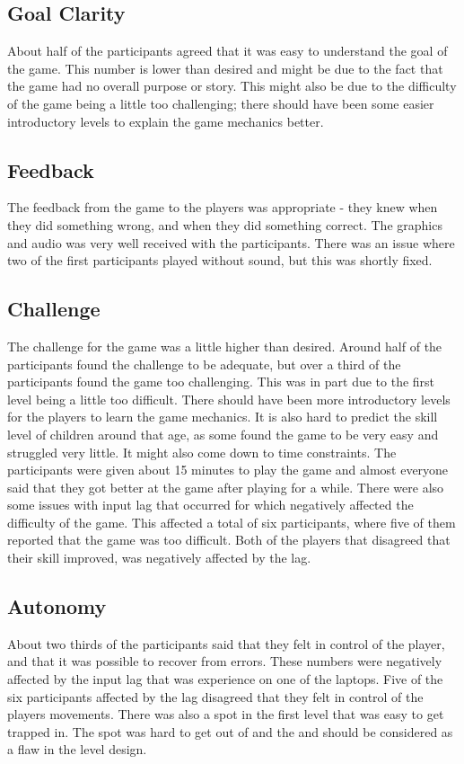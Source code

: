 \subsection{Goal Clarity}
About half of the participants agreed that it was easy to understand the goal of the game. This number is lower than desired and might be due to the fact that the game had no overall purpose or story. This might also be due to the difficulty of the game being a little too challenging; there should have been some easier introductory levels to explain the game mechanics better.

\subsection{Feedback}
The feedback from the game to the players was appropriate - they knew when they did something wrong, and when they did something correct. The graphics and audio was very well received with the participants. There was an issue where two of the first participants played without sound, but this was shortly fixed.

\subsection{Challenge}
The challenge for the game was a little higher than desired. Around half of the participants found the challenge to be adequate, but over a third of the participants found the game too challenging. This was in part due to the first level being a little too difficult. There should have been more introductory levels for the players to learn the game mechanics. It is also hard to predict the skill level of children around that age, as some found the game to be very easy and struggled very little. It might also come down to time constraints. The participants were given about 15 minutes to play the game and almost everyone said that they got better at the game after playing for a while. There were also some issues with input lag that occurred for  which negatively affected the difficulty of the game. This affected a total of six participants, where five of them reported that the game was too difficult. Both of the players that disagreed that their skill improved, was negatively affected by the lag.

\subsection{Autonomy}
About two thirds of the participants said that they felt in control of the player, and that it was possible to recover from errors. These numbers were negatively affected by the input lag that was experience on one of the laptops. Five of the six participants affected by the lag disagreed that they felt in control of the players movements. There was also a spot in the first level that was easy to get trapped in. The spot was hard to get out of and the and should be considered as a flaw in the level design.

